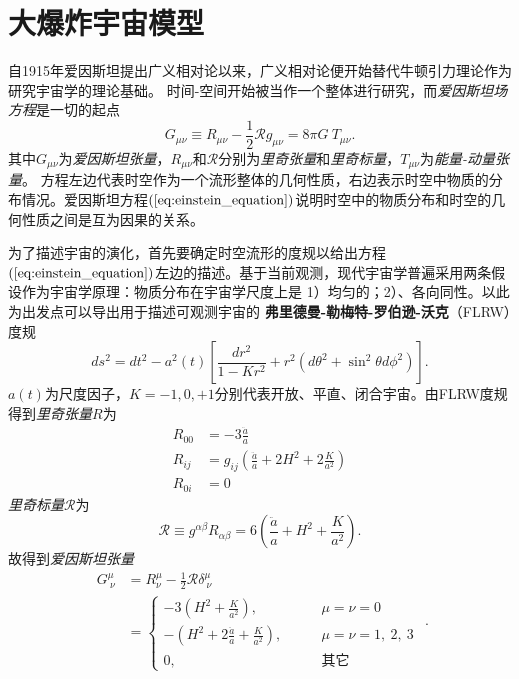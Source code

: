 \section{大爆炸宇宙模型}
自1915年爱因斯坦提出广义相对论以来，广义相对论便开始替代牛顿引力理论作为研究宇宙学的理论基础。
时间-空间开始被当作一个整体进行研究，而\textit{爱因斯坦场方程}是一切的起点
\begin{equation}
    \label{eq:einstein_equation}
    G_{\mu\nu}\equiv R_{\mu\nu}-\frac{1}{2}\mathcal{R}g_{\mu\nu}=8\pi G\ T_{\mu\nu}.
\end{equation}
其中$G_{\mu\nu}$为\textit{爱因斯坦张量}，$R_{\mu\nu}$和$\mathcal{R}$分别为\textit{里奇张量}和\textit{里奇标量}，$T_{\mu\nu}$为\textit{能量-动量张量}。
方程左边代表时空作为一个流形整体的几何性质，右边表示时空中物质的分布情况。爱因斯坦方程$(\ref{eq:einstein_equation})$说明时空中的物质分布和时空的几何性质之间是互为因果的关系。

为了描述宇宙的演化，首先要确定时空流形的度规以给出方程$(\ref{eq:einstein_equation})$左边的描述。基于当前观测，现代宇宙学普遍采用两条假设作为宇宙学原理：物质分布在宇宙学尺度上是
1）均匀的；2）、各向同性。以此为出发点可以导出用于描述可观测宇宙的
\textbf{弗里德曼-勒梅特-罗伯逊-沃克}（FLRW）度规
\begin{equation}\label{eq:frw_metric}
    ds^2=dt^2-a^2(t)\left[\frac{dr^2}{1-Kr^2}+r^2\left(d\theta^2+\sin^2\theta
    d\phi^2\right)\right].
\end{equation}
$a(t)$为尺度因子，$K=-1, 0,
+1$分别代表开放、平直、闭合宇宙。由FLRW度规得到\textit{里奇张量}$R$为
\begin{equation}
    \begin{split}
        R_{00} &= -3\frac{\ddot{a}}{a} \\
        R_{ij} &= g_{ij}\left(\frac{\ddot{a}}{a}+2H^2+2\frac{K}{a^2}\right) \\
        R_{0i} &= 0
    \end{split}
\end{equation}
\textit{里奇标量}$\mathcal{R}$为
\begin{equation}
    \label{eq:ricci_scalar}
    \mathcal{R} \equiv g^{\alpha\beta}R_{\alpha\beta} =
    6\left(\frac{\ddot{a}}{a}+H^2+\frac{K}{a^2}\right).
\end{equation}
故得到\textit{爱因斯坦张量}
\begin{equation}
    \label{eq:einstein_tensor}
    \begin{split}
        G^{\mu}_{\ \nu} &= R^{\mu}_{\nu} -
        \frac{1}{2}\mathcal{R}\delta^{\mu}_{\ \nu}\\
        &=
        \begin{cases}
            -3(H^2 + \frac{K}{a^2}),\qquad &\mu=\nu=0 \\
            -(H^2+2\frac{\ddot{a}}{a}+\frac{K}{a^2}),\qquad
            &\mu=\nu=1,\ 2,\ 3 \\
            0,\qquad &\text{其它}
        \end{cases}
    \end{split}.
\end{equation}

